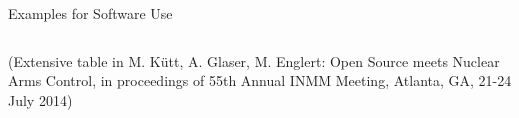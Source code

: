 \documentclass[presentation]{beamer}
\begin{document}
\begin{frame}[label=sec-7-6]{Examples for Software Use}
\begin{table}[htb]
\begin{center}
\begin{tabularx}{\textwidth}{>{\bf}RLLLL}
\bottomrule
\end{tabularx}
\end{center}
\label{tab:fields}
\end{table}

\begin{center}
\textcolor{gray!50}{\scriptsize (Extensive table in M. Kütt, A. Glaser, M. Englert: Open Source meets Nuclear Arms Control, in proceedings of 55th Annual INMM Meeting, Atlanta, GA, 21-24 July 2014)}
\end{center}
\end{frame}
\end{document}

